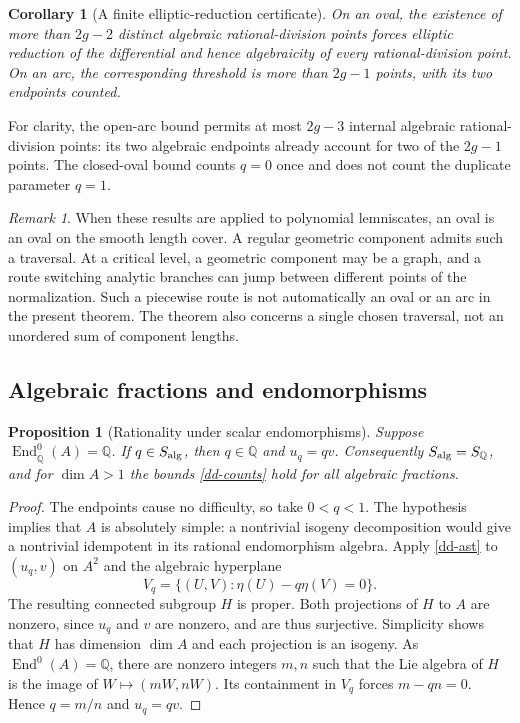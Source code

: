 \documentclass[11pt,a4paper]{article}
\newtheorem{proposition}[theorem]{Proposition}
\newtheorem{corollary}[theorem]{Corollary}
\theoremstyle{definition}
\theoremstyle{remark}
\newtheorem{remark}[theorem]{Remark}
\numberwithin{equation}{section}
\newcommand{\Qbar}{\overline{\mathbb Q}}
\begin{document}
\begin{corollary}[A finite elliptic-reduction certificate]\label{dd-certificate}
On an oval, the existence of more than $2g-2$ distinct algebraic
rational-division points forces elliptic reduction of the differential
and hence algebraicity of every rational-division point.  On an arc,
the corresponding threshold is more than $2g-1$ points, with its two
endpoints counted.
\end{corollary}

For clarity, the open-arc bound permits at most $2g-3$ internal
algebraic rational-division points: its two algebraic endpoints
already account for two of the $2g-1$ points.  The closed-oval bound
counts $q=0$ once and does not count the duplicate parameter $q=1$.

\begin{remark}\label{dd-geometric-scope}
When these results are applied to polynomial lemniscates, an oval is an
oval on the smooth length cover.  A regular geometric component admits
such a traversal.  At a critical level, a geometric component may be a
graph, and a route switching analytic branches can jump between
different points of the normalization.  Such a piecewise route is not
automatically an oval or an arc in the present theorem.  The theorem
also concerns a single chosen traversal, not an unordered sum of
component lengths.
\end{remark}

\subsection{Algebraic fractions and endomorphisms}

\begin{proposition}[Rationality under scalar endomorphisms]\label{dd-scalar}
Suppose $\operatorname{End}_{\Qbar}^{0}(A)=\mathbb Q$.
If $q\in S_{\rm alg}$, then $q\in\mathbb Q$ and $u_q=qv$.
Consequently $S_{\rm alg}=S_{\mathbb Q}$, and for $\dim A>1$ the
bounds \eqref{dd-counts} hold for all algebraic fractions.
\end{proposition}

\begin{proof}
The endpoints cause no difficulty, so take $0<q<1$.  The hypothesis
implies that $A$ is absolutely simple: a nontrivial isogeny
decomposition would give a nontrivial idempotent in its rational
endomorphism algebra.  Apply \eqref{dd-ast} to $(u_q,v)$ on $A^2$ and
the algebraic hyperplane
\[
 V_q=\{(U,V):\eta(U)-q\eta(V)=0\}.
\]
The resulting connected subgroup $H$ is proper.  Both projections of
$H$ to $A$ are nonzero, since $u_q$ and $v$ are nonzero, and are thus
surjective.  Simplicity shows that $H$ has dimension $\dim A$ and each
projection is an isogeny.  As $\operatorname{End}^0(A)=\mathbb Q$,
there are nonzero integers $m,n$ such that the Lie algebra of $H$ is
the image of $W\mapsto(mW,nW)$.  Its containment in $V_q$ forces
$m-qn=0$.  Hence $q=m/n$ and $u_q=qv$.
\end{proof}
\end{document}
